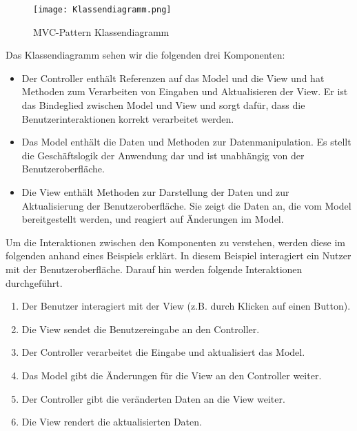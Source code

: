 \begin{figure}[h]
\centering
\texttt{[image: Klassendiagramm.png]}
\caption{MVC-Pattern Klassendiagramm}
\end{figure}

Das Klassendiagramm sehen wir die folgenden drei Komponenten:
\newpage
\begin{itemize}
\item Der Controller enthält Referenzen auf das Model und die View und hat Methoden zum Verarbeiten von Eingaben und Aktualisieren der View. Er ist das Bindeglied zwischen Model und View und sorgt dafür, dass die Benutzerinteraktionen korrekt verarbeitet werden.

\item Das Model enthält die Daten und Methoden zur Datenmanipulation. Es stellt die Geschäftslogik der Anwendung dar und ist unabhängig von der Benutzeroberfläche.

\item Die View enthält Methoden zur Darstellung der Daten und zur Aktualisierung der Benutzeroberfläche. Sie zeigt die Daten an, die vom Model bereitgestellt werden, und reagiert auf Änderungen im Model.
\end{itemize}

Um die Interaktionen zwischen den Komponenten zu verstehen, werden diese im folgenden anhand eines Beispiels erklärt. In diesem Beispiel interagiert ein Nutzer mit der Benutzeroberfläche. Darauf hin werden folgende Interaktionen durchgeführt.

\begin{enumerate}
\item Der Benutzer interagiert mit der View (z.B. durch Klicken auf einen Button).

\item Die View sendet die Benutzereingabe an den Controller.

\item Der Controller verarbeitet die Eingabe und aktualisiert das Model.

\item Das Model gibt die Änderungen für die View an den Controller weiter.

\item Der Controller gibt die veränderten Daten an die View weiter.

\item Die View rendert die aktualisierten Daten.
\end{enumerate}

